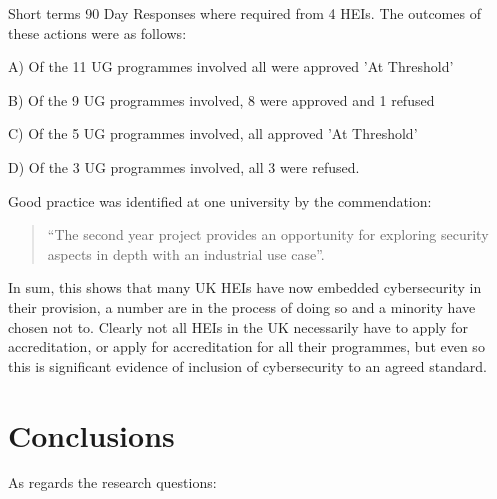 \documentclass[conference]{IEEEtran}
\begin{document}
Short terms 90 Day Responses where required from 4 HEIs. The outcomes of these actions were as follows:
                                                                        
A)	Of the 11 UG programmes involved all were approved 'At Threshold'

B)	Of the 9 UG programmes involved, 8 were approved and 1 refused

C)	Of the 5 UG programmes involved, all approved 'At Threshold'

D)	Of the 3 UG programmes involved, all 3 were refused.
 
Good practice was identified at one university by the commendation:
 \begin{quote}
``The second year project provides an opportunity for exploring security aspects in depth with an industrial use case''.
\end{quote}
In sum, this shows that many UK HEIs have now embedded cybersecurity in their provision, a number are in the process of doing so and a minority have chosen not to. Clearly not all HEIs in the UK necessarily have to apply for accreditation, or apply for accreditation for all their programmes, but even so this is significant evidence of inclusion of cybersecurity to an agreed standard.

\section{Conclusions}
As regards the research questions:
\end{document}
